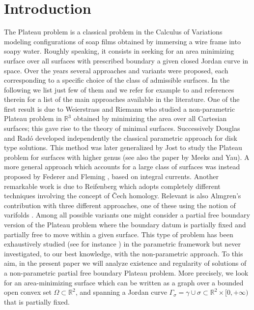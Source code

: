 \documentclass[11pt]{article}
\numberwithin{equation}{section}
\newcommand{\R}{\mathbb{R}}
\theoremstyle{definition}
\begin{document}
\section{Introduction}\label{sec:introduction}

The Plateau problem is a classical problem in the Calculus of Variations modeling configurations of soap films obtained by immersing a wire frame into soapy water. Roughly speaking, it consists in seeking for an area minimizing surface over all surfaces with prescribed boundary a given closed Jordan curve in space.
Over the years several approaches and variants were proposed, each corresponding to a specific choice of the class of admissible surfaces. In the following we list just few of them and we refer for example to \cite{Harrison-Pugh} and references therein for a list of the main approaches available in the literature.
One of the first result is due to Weierstrass and Riemann who studied a non-parametric Plateau problem in $\R^3$
obtained by minimizing the area over all Cartesian surfaces; this gave rise to the theory of minimal surfaces.
Successively Douglas and Radó developed independently \cite{Douglas,Rado} the classical parametric approach for disk type solutions. This method was later generalized by Jost \cite{Jost} to study the Plateau problem for surfaces with higher genus (see also
the paper \cite{MY} by Meeks and Yau).
A more general approach which accounts for a large class of surfaces was instead proposed by Federer and Fleming \cite{FedererFleming},
based on integral currents. Another remarkable work is due to Reifenberg \cite{Reifenberg} which adopts completely different techniques involving the concept of Čech homology. Relevant is also Almgren's contribution with three different approaches, one of these using the notion of varifolds \cite{Almgren65}.
Among all possible variants one might consider a partial free boundary version of the Plateau problem where the boundary datum is partially
fixed and partially free to move within a given surface.
This type of problem has been exhaustively studied (see for instance \cite{DHS}) in the parametric framework but never investigated,
to our best knowledge, with the non-parametric approach. To this aim, in the present paper we will analyze existence and regularity of solutions of a non-parametric partial free boundary Plateau problem.
More precisely,
we look for an area-minimizing surface
which can be written as a graph over a bounded open convex set
$\Omega\subset \R^2$,
and spanning
a Jordan curve $\Gamma_\sigma=\gamma\cup \sigma \subset \R^2 \times [0,+\infty)$ that is partially fixed.
\end{document}
